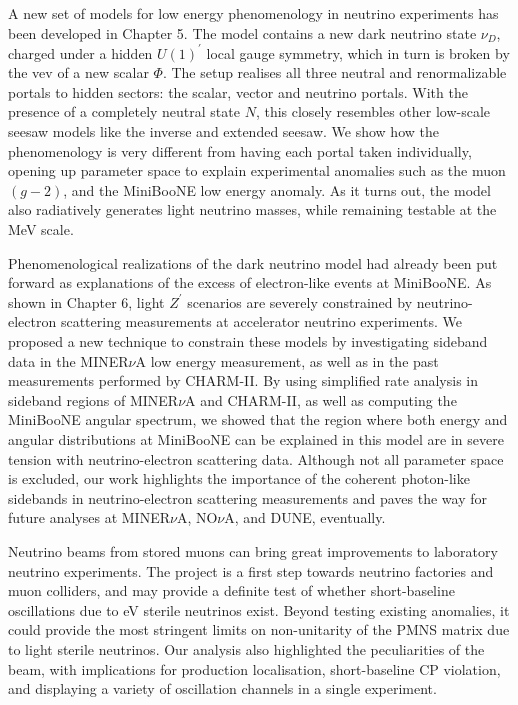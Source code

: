 A new set of models for low energy phenomenology in neutrino experiments has been developed in Chapter 5. The model contains a new dark neutrino state $\nu_D$, charged under a hidden $U(1)^\prime$ local gauge symmetry, which in turn is broken by the vev of a new scalar $\Phi$. The setup realises all three neutral and renormalizable portals to hidden sectors: the scalar, vector and neutrino portals. With the presence of a completely neutral state $N$, this closely resembles other low-scale seesaw models like the inverse and extended seesaw. We show how the phenomenology is very different from having each portal taken individually, opening up parameter space to explain experimental anomalies such as the muon $(g-2)$, and the MiniBooNE low energy anomaly. As it turns out, the model also radiatively generates light neutrino masses, while remaining testable at the MeV scale.  

Phenomenological realizations of the dark neutrino model had already been put forward as explanations of the excess of electron-like events at MiniBooNE. As shown in Chapter 6, light $Z^\prime$ scenarios are severely constrained by neutrino-electron scattering measurements at accelerator neutrino experiments. We proposed a new technique to constrain these models by investigating sideband data in the MINER$\nu$A low energy measurement, as well as in the past measurements performed by CHARM-II. By using simplified rate analysis in sideband regions of MINER$\nu$A and CHARM-II, as well as computing the MiniBooNE angular spectrum, we showed that the region where both energy and angular distributions at MiniBooNE can be explained in this model are in severe tension with neutrino-electron scattering data. Although not all parameter space is excluded, our work highlights the importance of the coherent photon-like sidebands in neutrino-electron scattering measurements and paves the way for future analyses at MINER$\nu$A, NO$\nu$A, and DUNE, eventually.

Neutrino beams from stored muons can bring great improvements to laboratory neutrino experiments. The \nus project is a first step towards neutrino factories and muon colliders, and may provide a definite test of whether short-baseline oscillations due to eV sterile neutrinos exist. Beyond testing existing anomalies, it could provide the most stringent limits on non-unitarity of the PMNS matrix due to light sterile neutrinos. Our analysis also highlighted the peculiarities of the beam, with implications for production localisation, short-baseline CP violation, and displaying a variety of oscillation channels in a single experiment.

